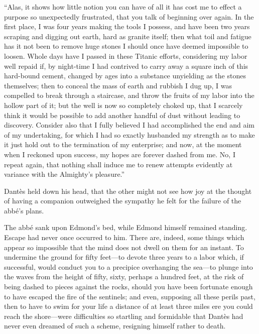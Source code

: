 “Alas, it shows how little notion you can have of all it has cost me to
effect a purpose so unexpectedly frustrated, that you talk of beginning
over again. In the first place, I was four years making the tools I
possess, and have been two years scraping and digging out earth, hard
as granite itself; then what toil and fatigue has it not been to remove
huge stones I should once have deemed impossible to loosen. Whole days
have I passed in these Titanic efforts, considering my labor well
repaid if, by night-time I had contrived to carry away a square inch of
this hard-bound cement, changed by ages into a substance unyielding as
the stones themselves; then to conceal the mass of earth and rubbish I
dug up, I was compelled to break through a staircase, and throw the
fruits of my labor into the hollow part of it; but the well is now so
completely choked up, that I scarcely think it would be possible to add
another handful of dust without leading to discovery. Consider also
that I fully believed I had accomplished the end and aim of my
undertaking, for which I had so exactly husbanded my strength as to
make it just hold out to the termination of my enterprise; and now, at
the moment when I reckoned upon success, my hopes are forever dashed
from me. No, I repeat again, that nothing shall induce me to renew
attempts evidently at variance with the Almighty’s pleasure.”

Dantès held down his head, that the other might not see how joy at the
thought of having a companion outweighed the sympathy he felt for the
failure of the abbé’s plans.

The abbé sank upon Edmond’s bed, while Edmond himself remained
standing. Escape had never once occurred to him. There are, indeed,
some things which appear so impossible that the mind does not dwell on
them for an instant. To undermine the ground for fifty feet—to devote
three years to a labor which, if successful, would conduct you to a
precipice overhanging the sea—to plunge into the waves from the height
of fifty, sixty, perhaps a hundred feet, at the risk of being dashed to
pieces against the rocks, should you have been fortunate enough to have
escaped the fire of the sentinels; and even, supposing all these perils
past, then to have to swim for your life a distance of at least three
miles ere you could reach the shore—were difficulties so startling and
formidable that Dantès had never even dreamed of such a scheme,
resigning himself rather to death.

